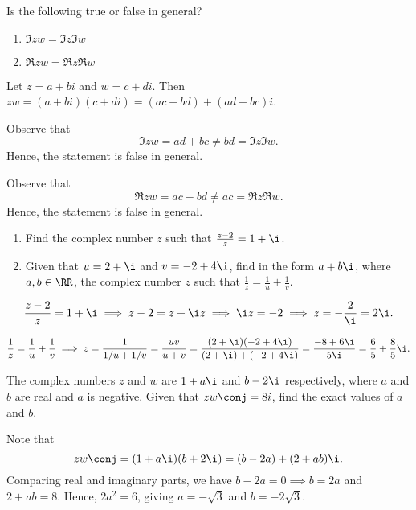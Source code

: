 \begin{problem}
    Is the following true or false in general?
    \begin{enumerate}
        \item $\Im{zw} = \Im{z} \Im{w}$
        \item $\Re{zw} = \Re{z} \Re{w}$
    \end{enumerate}
\end{problem}
\begin{solution}
    Let $z = a + bi$ and $w = c + di$. Then $zw = (a+bi)(c+di) = (ac-bd) + (ad+bc)i$.

    \begin{ppart}
        Observe that \[\Im{zw} = ad+bc \neq bd = \Im{z}\Im{w}.\] Hence, the statement is false in general.
    \end{ppart}
    \begin{ppart}
        Observe that \[\Re{zw} = ac-bd \neq ac = \Re{z}\Re{w}.\] Hence, the statement is false in general.
    \end{ppart}
\end{solution}

\clearpage
\begin{problem}
    \begin{enumerate}
        \item Find the complex number $z$ such that $\frac{z-2}{z} = 1 + \i$.
        \item Given that $u = 2 + \i$ and $v = -2 + 4\i$, find in the form $a + b\i$, where $a, b \in \RR$, the complex number $z$ such that $\frac1z = \frac1u + \frac1v$.
    \end{enumerate}
\end{problem}
\begin{solution}
    \begin{ppart}
        \[\frac{z-2}{z} = 1 + \i \implies z-2 = z + \i z \implies \i z = -2 \implies z = -\frac{2}{\i} = 2\i.\]
    \end{ppart}
    \begin{ppart}
        \[\frac1z = \frac1u + \frac1v \implies z = \frac1{1/u + 1/v} = \frac{uv}{u + v} = \frac{(2+\i)(-2+4\i)}{(2+\i) + (-2+4\i)} = \frac{-8 + 6\i}{5\i} = \frac65 + \frac85 \i.\]
    \end{ppart}
\end{solution}

\begin{problem}
    The complex numbers $z$ and $w$ are $1 + a\i$ and $b - 2\i$ respectively, where $a$ and $b$ are real and $a$ is negative. Given that $zw\conj = 8i$, find the exact values of $a$ and $b$.
\end{problem}
\begin{solution}
    Note that \[zw\conj = (1+a\i)(b+2\i) = (b - 2a) + (2+ab)\i.\] Comparing real and imaginary parts, we have $b-2a = 0 \implies b = 2a$ and $2+ab = 8$. Hence, $2a^2 = 6$, giving $a = -\sqrt3$ and $b = -2\sqrt3$.
\end{solution}

